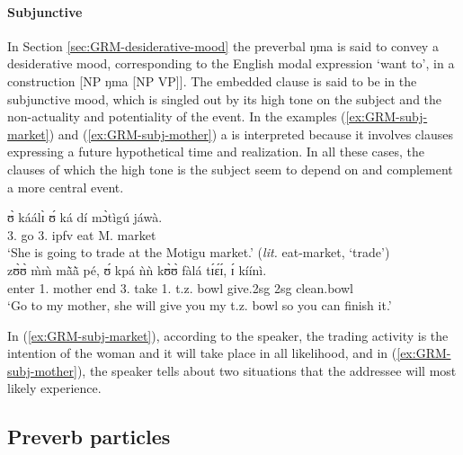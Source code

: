 \begin{exe}
\begin{exe}
\begin{exe}
\begin{exe}
\begin{exe}
\begin{exe}
\begin{exe}
\begin{exe}
\begin{exe}
\begin{exe}
\begin{exe}
\paragraph{Subjunctive}
\label{sec:GRM-subjunctive}

In Section \ref{sec:GRM-desiderative-mood} the preverbal {\sls ŋma}  is said to  convey a 
desiderative mood,  corresponding to the English modal expression `want to',  in a construction [NP 
{\sls ŋma} [NP VP]].  The embedded clause is said to be in the subjunctive mood, which is singled 
out by its high tone on the subject  and  the non-actuality and potentiality of the event.  In the examples (\ref{ex:GRM-subj-market}) and (\ref{ex:GRM-subj-mother}) a  
 is interpreted because it involves clauses expressing a future hypothetical time and 
realization. In all these cases, the clauses of which the high tone  is the subject seem to 
depend on and complement a more central event.

\ea
\ea\label{ex:GRM-subj-market}
\gll   ʊ̀ káálɪ̀ ʊ́ ká dí mɔ̀tìgú jáwà.\\
 {3.\sg} go  {3.\sg} {\sc ipfv} eat M. market \\
\glt `She is going to trade at the Motigu market.' ({\it lit.} eat-market,  `trade')\\

 
\ex\label{ex:GRM-subj-mother}
\gll zʊ̀ʊ̀ m̀m̀ mã̀ã̀ pé, ʊ́ kpá ǹǹ kʊ̀ʊ̀ fàlá tɪ́ɛ́ɪ́, ɪ́ kíínì.\\
 enter   {1.\sg} mother end  {3.\sg} take    {1.\sg\poss} t.z. bowl give.{\sc 2sg} {\sc 
2sg} clean.bowl\\
\glt `Go to my mother, she will give you my t.z. bowl so you can finish it.'\\

 \z
 \z
 
 In  (\ref{ex:GRM-subj-market}), according to the speaker, the trading activity is the intention of the woman and it will take place in all likelihood, and in  (\ref{ex:GRM-subj-mother}),  the speaker tells about two situations that the addressee  will most likely experience. 



\subsection{Preverb particles}
\label{sec:GRM-precerv}


\end{exe}
\end{exe}
\end{exe}
\end{exe}
\end{exe}
\end{exe}
\end{exe}
\end{exe}
\end{exe}
\end{exe}
\end{exe}
